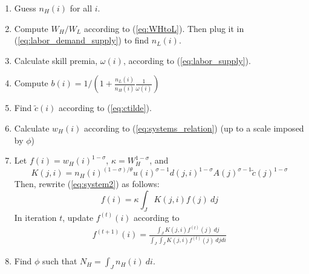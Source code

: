 \documentclass{article}
\begin{document}
\begin{enumerate}
\item Guess $n_H(i)$ for all $i$.
\item Compute $W_H/W_L$ according to (\ref{eq:WHtoL}). Then plug it in (\ref{eq:labor_demand_supply}) to find $n_L(i)$.
\item Calculate skill premia, $\omega(i)$, according to (\ref{eq:labor_supply}).
\item Compute $b(i)
= 1/(1 + \frac{n_L(i)}{n_H(i)} \frac{1}{\omega(i)})$
\item Find $\tilde{c}(i)$ according to (\ref{eq:ctilde}).
\item Calculate $w_H(i)$ according to (\ref{eq:systems_relation}) (up to a scale imposed by $\phi$)
\item Let $f(i)=w_H(i)^{1-\sigma}$, $\kappa=W_H^{1-\sigma}$, and
\[
K(j,i) = n_H(i)^{(1-\sigma)/\theta}u(i)^{\sigma-1} d(j,i)^{1-\sigma} A(j)^{\sigma-1} \tilde{c}(j)^{1-\sigma}
\]
Then, rewrite (\ref{eq:system2}) as follows:
\[
f(i) = \kappa \int_J K(j,i) f(j)~dj
\]
In iteration $t$, update $f^{(t)}(i)$ according to
\begin{eqnarray}
	f^{(t+1)}(i) = \frac{\int_J K(j,i) f^{(t)}(j)~dj}{\int_J \int_J K(j,i) f^{(t)}(j)~dj di}
\end{eqnarray}
\item Find $\phi$ such that $N_H=\int_J n_H(i)~di$.
\end{enumerate}
% 
% 
% 
% 
% 
% 
% 
\end{document}
